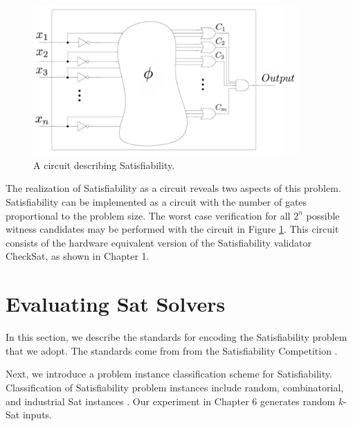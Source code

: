\begin{figure}[htbp]
\begin{center}

	\includegraphics[width=0.9\textwidth]{figures/circuitLabeled.jpg}

\caption{A circuit describing {\sc Satisfiability}.}
\label{blackBoxSat}
\end{center}
\end{figure}
	
\FloatBarrier

The realization of {\sc Satisfiability} as a circuit reveals two aspects of this problem.  {\sc Satisfiability} can be implemented as a circuit with the number of gates proportional to the problem size.  The worst case verification for all $2^n$ possible witness candidates may be performed with the circuit in Figure \ref{blackBoxSat}.  This circuit consists of the hardware equivalent version of the {\sc Satisfiability} validator {\sc CheckSat}, as shown in Chapter 1.  
	
\section{Evaluating {\sc Sat} Solvers}

	
	In this section, we describe the standards for encoding the {\sc Satisfiability} problem that we adopt.  The standards come from from the {\sc Satisfiability} Competition \cite{dimacsFormat, satcompetition}.  
	
	Next, we introduce a problem instance classification scheme for {\sc Satisfiability}.  Classification of {\sc Satisfiability} problem instances include random, combinatorial, and industrial {\sc Sat} instances \cite{satcompetition}.  Our experiment in Chapter 6 generates random $k$-{\sc Sat} inputs.

